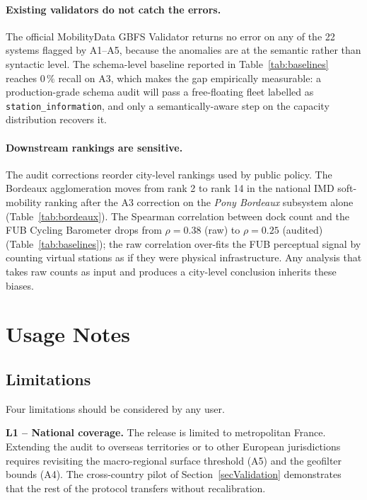 \documentclass[11pt,a4paper]{article}
\begin{document}
\paragraph{Existing validators do not catch the errors.}
The official MobilityData GBFS Validator
\cite{MobilityData2024Validator} returns no error on any of the 22
systems flagged by A1--A5, because the anomalies are at the
semantic rather than syntactic level. The schema-level baseline
reported in Table~\ref{tab:baselines} reaches $0\,\%$ recall on A3,
which makes the gap empirically measurable: a production-grade
schema audit will pass a free-floating fleet labelled as
\texttt{station\_information}, and only a semantically-aware step on
the capacity distribution recovers it.

\paragraph{Downstream rankings are sensitive.}
The audit corrections reorder city-level rankings used by public
policy. The Bordeaux agglomeration moves from rank 2 to rank 14
in the national IMD soft-mobility ranking \cite{Fosse2026imd} after
the A3 correction on the \emph{Pony Bordeaux} subsystem alone
(Table~\ref{tab:bordeaux}). The Spearman correlation between dock
count and the FUB Cycling Barometer drops from
$\rho = 0.38$ (raw) to $\rho = 0.25$ (audited)
(Table~\ref{tab:baselines}); the raw correlation over-fits
the FUB perceptual signal by counting virtual stations as if they
were physical infrastructure. Any analysis that takes raw counts
as input and produces a city-level conclusion inherits these biases.

\section{Usage Notes}\label{secUsage}

\subsection{Limitations}\label{secLimitations}
Four limitations should be considered by any user.

\textbf{L1 -- National coverage.} The release is limited to
metropolitan France. Extending the audit to overseas territories or
to other European jurisdictions requires revisiting the
macro-regional surface threshold (A5) and the geofilter bounds (A4).
The cross-country pilot of Section~\ref{secValidation} demonstrates
that the rest of the protocol transfers without recalibration.
\end{document}
